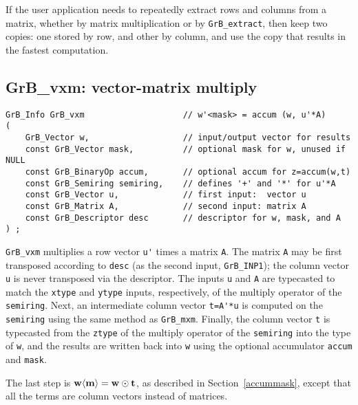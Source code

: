 \documentclass[12pt]{article}
\begin{document}
If the user application needs to repeatedly extract rows and columns from a
matrix, whether by matrix multiplication or by \verb'GrB_extract', then keep
two copies: one stored by row, and other by column, and use the copy that
results in the fastest computation.

\newpage
\subsection{{\sf GrB\_vxm:} vector-matrix multiply} %
\label{vxm}

\begin{mdframed}[userdefinedwidth=6in]
{\footnotesize
\begin{verbatim}
GrB_Info GrB_vxm                    // w'<mask> = accum (w, u'*A)
(
    GrB_Vector w,                   // input/output vector for results
    const GrB_Vector mask,          // optional mask for w, unused if NULL
    const GrB_BinaryOp accum,       // optional accum for z=accum(w,t)
    const GrB_Semiring semiring,    // defines '+' and '*' for u'*A
    const GrB_Vector u,             // first input:  vector u
    const GrB_Matrix A,             // second input: matrix A
    const GrB_Descriptor desc       // descriptor for w, mask, and A
) ;
\end{verbatim} } \end{mdframed}

\verb'GrB_vxm' multiplies a row vector \verb"u'" times a matrix \verb'A'.  The
matrix \verb'A' may be first transposed according to \verb'desc' (as the second
input, \verb'GrB_INP1'); the column vector \verb'u' is never transposed via the
descriptor.  The inputs \verb'u' and \verb'A' are typecasted to match the
\verb'xtype' and \verb'ytype' inputs, respectively, of the multiply operator of
the \verb'semiring'.  Next, an intermediate column vector \verb"t=A'*u" is
computed on the \verb'semiring' using the same method as \verb'GrB_mxm'.
Finally, the column vector \verb't' is typecasted from the \verb'ztype' of the
multiply operator of the \verb'semiring' into the type of \verb'w', and the
results are written back into \verb'w' using the optional accumulator
\verb'accum' and \verb'mask'.

The last step is ${\bf w \langle m \rangle  = w \odot t}$, as described
in Section~\ref{accummask}, except that all the
terms are column vectors instead of matrices.
\end{document}
